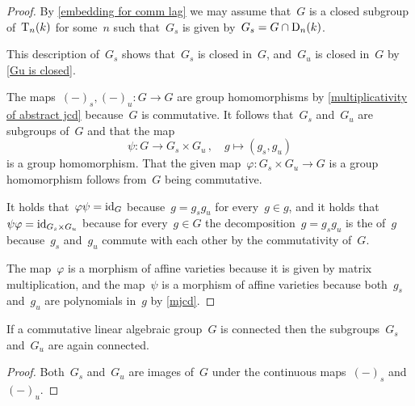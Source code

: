 \begin{proof}
  By \cref{embedding for comm lag} we may assume that~$G$ is a closed subgroup of~$\operatorname{T}_n(k)$ for some~$n$ such that~$G_s$ is given by~$G_s = G \cap \operatorname{D}_n(k)$.
  
  This description of~$G_s$ shows that~$G_s$ is closed in~$G$, and~$G_u$ is closed in~$G$ by \cref{Gu is closed}.
  
  The maps~$(-)_s, (-)_u \colon G \to G$ are group homomorphisms by \cref{multiplicativity of abstract jcd} because~$G$ is commutative.
  It follows that~$G_s$ and~$G_u$ are subgroups of~$G$ and that the map
  \[
            \psi
    \colon  G
    \to     G_s \times G_u \,,
    \quad   g
    \mapsto (g_s, g_u)
  \]
  is a group homomorphism.
  That the given map~$\varphi \colon G_s \times G_u \to G$ is a group homomorphism follows from~$G$ being commutative.
  
  It holds that~$\varphi \psi = \operatorname{id}_G$ because~$g = g_s g_u$ for every~$g \in g$, and it holds that~$\psi \varphi = \operatorname{id}_{G_s \times G_u}$ because for every~$g \in G$ the decomposition~$g = g_s g_u$ is the {\JCD} of~$g$ because~$g_s$ and~$g_u$ commute with each other by the commutativity of~$G$.
  
  The map~$\varphi$ is a morphism of affine varieties because it is given by matrix multiplication, and the map~$\psi$ is a morphism of affine varieties because both~$g_s$ and~$g_u$ are polynomials in~$g$ by \cref{mjcd}.
\end{proof}


\begin{corollary}
  If a commutative linear algebraic group~$G$ is connected then the subgroups~$G_s$ and~$G_u$ are again connected.
\end{corollary}


\begin{proof}
  Both~$G_s$ and~$G_u$ are images of~$G$ under the continuous maps~$(-)_s$ and~$(-)_u$.
\end{proof}





